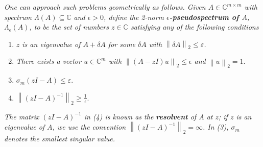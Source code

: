 \documentclass[a4paper,oneside]{book}
\numberwithin{equation}{chapter}
\begin{document}
\textit{One can approach such problems geometrically as follows. Given $A\in \mathbb{C}^{m\times m}$ with spectrum $\Lambda \left( A \right) \subseteq \mathbb{C}$ and $\epsilon >0$, define the 2-norm \textbf{$\epsilon$-pseudospectrum of $A$}, ${\Lambda _\epsilon }\left( A \right)$, to be the set of numbers $z \in \mathbb{C}$ satisfying any of the following conditions}
\begin{enumerate}
\item \textit{$z$ is an eigenvalue of $A+\delta A$ for some $\delta A$ with ${\left\| {\delta A} \right\|_2} \le \varepsilon $.}
\item \textit{There exists a vector $u\in \mathbb{C}^m$ with ${\left\| {\left( {A - zI} \right)u} \right\|_2} \le \epsilon$ and ${\left\| u \right\|_2} = 1$}.
\item ${\sigma _m}\left( {zI - A} \right) \le \varepsilon $.
\item ${\left\| {{{\left( {zI - A} \right)}^{ - 1}}} \right\|_2} \ge \frac{1}{\epsilon }$.
\end{enumerate}
\textit{The matrix ${{{\left( {zI - A} \right)}^{ - 1}}}$ in (4) is known as the \textbf{resolvent} of $A$ at $z$; if $z$ is an eigenvalue of $A$, we use the convention ${\left\| {{{\left( {zI - A} \right)}^{ - 1}}} \right\|_2} = \infty $. In (3), $\sigma _m$ denotes the smallest singular value.}
\end{document}

